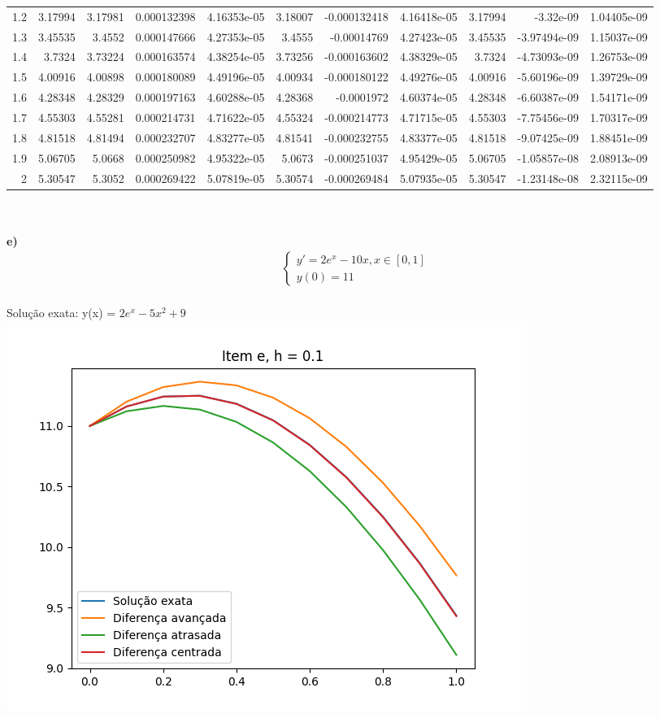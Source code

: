 {\begin{tabular}{rrrrrrrrrrr}
 1.2 & 3.17994  & 3.17981  &   0.000132398 &   4.16353e-05 & 3.18007  &  -0.000132418 &   4.16418e-05 & 3.17994  &  -3.32e-09    &   1.04405e-09 \\
 1.3 & 3.45535  & 3.4552   &   0.000147666 &   4.27353e-05 & 3.4555   &  -0.00014769  &   4.27423e-05 & 3.45535  &  -3.97494e-09 &   1.15037e-09 \\
 1.4 & 3.7324   & 3.73224  &   0.000163574 &   4.38254e-05 & 3.73256  &  -0.000163602 &   4.38329e-05 & 3.7324   &  -4.73093e-09 &   1.26753e-09 \\
 1.5 & 4.00916  & 4.00898  &   0.000180089 &   4.49196e-05 & 4.00934  &  -0.000180122 &   4.49276e-05 & 4.00916  &  -5.60196e-09 &   1.39729e-09 \\
 1.6 & 4.28348  & 4.28329  &   0.000197163 &   4.60288e-05 & 4.28368  &  -0.0001972   &   4.60374e-05 & 4.28348  &  -6.60387e-09 &   1.54171e-09 \\
 1.7 & 4.55303  & 4.55281  &   0.000214731 &   4.71622e-05 & 4.55324  &  -0.000214773 &   4.71715e-05 & 4.55303  &  -7.75456e-09 &   1.70317e-09 \\
 1.8 & 4.81518  & 4.81494  &   0.000232707 &   4.83277e-05 & 4.81541  &  -0.000232755 &   4.83377e-05 & 4.81518  &  -9.07425e-09 &   1.88451e-09 \\
 1.9 & 5.06705  & 5.0668   &   0.000250982 &   4.95322e-05 & 5.0673   &  -0.000251037 &   4.95429e-05 & 5.06705  &  -1.05857e-08 &   2.08913e-09 \\
 2   & 5.30547  & 5.3052   &   0.000269422 &   5.07819e-05 & 5.30574  &  -0.000269484 &   5.07935e-05 & 5.30547  &  -1.23148e-08 &   2.32115e-09 \\
\hline
\end{tabular}
}
        \\
        \\
        \textbf{e)}
    \begin{align*}
    \begin{cases}
        y' = 2e^x - 10x, x \in [0, 1] \\
        y(0) = 11
    \end{cases}
    \end{align*}
    \\
    Solução exata: y(x) = $2e^x - 5x^2 + 9$\\\includegraphics{e_h_0.1.png}
